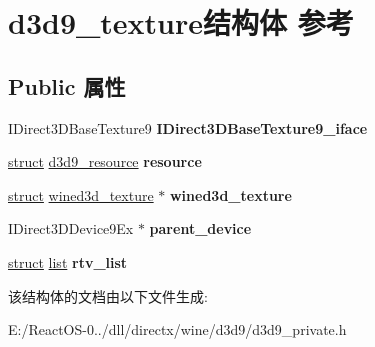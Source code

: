 \hypertarget{structd3d9__texture}{}\section{d3d9\+\_\+texture结构体 参考}
\label{structd3d9__texture}
\subsection*{Public 属性}
\begin{DoxyCompactItemize}
\item 
\mbox{\label{structd3d9__texture_ad93c4584731a04465a066e3958356577}} 
I\+Direct3\+D\+Base\+Texture9 {\bfseries I\+Direct3\+D\+Base\+Texture9\+\_\+iface}
\item 
\mbox{\label{structd3d9__texture_a6f3307ebd01dc8dd944f4a8e91d0be63}} 
\hyperlink{interfacestruct}{struct} \hyperlink{structd3d9__resource}{d3d9\+\_\+resource} {\bfseries resource}
\item 
\mbox{\label{structd3d9__texture_a5af88ec67f06f88446fa42a6145aab0e}} 
\hyperlink{interfacestruct}{struct} \hyperlink{structwined3d__texture}{wined3d\+\_\+texture} $\ast$ {\bfseries wined3d\+\_\+texture}
\item 
\mbox{\label{structd3d9__texture_a822264624887abd2dd80972af2b93bc7}} 
I\+Direct3\+D\+Device9\+Ex $\ast$ {\bfseries parent\+\_\+device}
\item 
\mbox{\label{structd3d9__texture_a6da0aa0703f999bb6b8d8ef6f8ae7718}} 
\hyperlink{interfacestruct}{struct} \hyperlink{classlist}{list} {\bfseries rtv\+\_\+list}
\end{DoxyCompactItemize}


该结构体的文档由以下文件生成\+:\begin{DoxyCompactItemize}
\item 
E\+:/\+React\+O\+S-\/0../dll/directx/wine/d3d9/d3d9\+\_\+private.\+h\end{DoxyCompactItemize}
